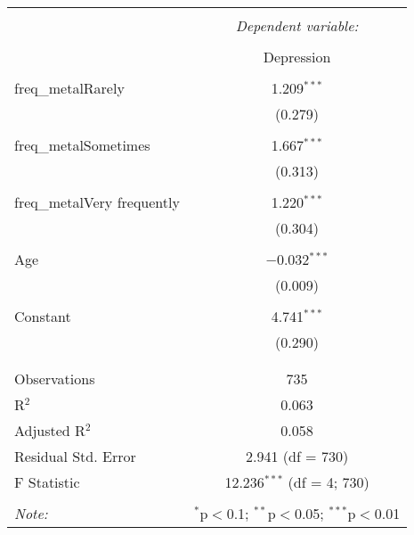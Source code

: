 \documentclass{article}
\begin{document}
\begin{table}[!htbp] \centering 
  \caption{} 
  \label{} 
\begin{tabular}{@{\extracolsep{5pt}}lc} 
\\[-1.8ex]\hline 
\hline \\[-1.8ex] 
 & \multicolumn{1}{c}{\textit{Dependent variable:}} \\ 
\cline{2-2} 
\\[-1.8ex] & Depression \\ 
\hline \\[-1.8ex] 
 freq\_metalRarely & 1.209$^{***}$ \\ 
  & (0.279) \\ 
  & \\ 
 freq\_metalSometimes & 1.667$^{***}$ \\ 
  & (0.313) \\ 
  & \\ 
 freq\_metalVery frequently & 1.220$^{***}$ \\ 
  & (0.304) \\ 
  & \\ 
 Age & $-$0.032$^{***}$ \\ 
  & (0.009) \\ 
  & \\ 
 Constant & 4.741$^{***}$ \\ 
  & (0.290) \\ 
  & \\ 
\hline \\[-1.8ex] 
Observations & 735 \\ 
R$^{2}$ & 0.063 \\ 
Adjusted R$^{2}$ & 0.058 \\ 
Residual Std. Error & 2.941 (df = 730) \\ 
F Statistic & 12.236$^{***}$ (df = 4; 730) \\ 
\hline 
\hline \\[-1.8ex] 
\textit{Note:}  & \multicolumn{1}{r}{$^{*}$p$<$0.1; $^{**}$p$<$0.05; $^{***}$p$<$0.01} \\ 
\end{tabular} 
\end{table} 
\end{document}
